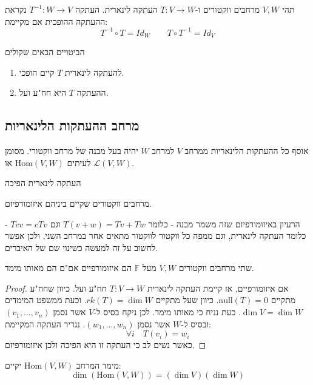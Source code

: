 \documentclass{tstextbook}
\begin{document}
\begin{definition}
תהי \(V, W\)  מרחבים ווקטורים ו-\(T:V\to W\) העתקה לינארית. העתקה \(T^{-1}:W\to V\) נקראת ההעתקה ההופכית אם מקיימת:
$$T^{-1}\circ  T=Id_{W}\qquad T\circ T^{-1}=Id_{V}$$

\end{definition}
\begin{proposition}
הביטויים הבאים שקולים

  \begin{enumerate}
    \item להעתקה לינארית \(T\) קיים הופכי. 


    \item ההעתקה \(T\) היא חח"ע ועל. 


  \end{enumerate}
\end{proposition}
\subsection{מרחב ההעתקות הלינאריות}

\begin{proposition}
אוסף כל ההעתקות הלינאריות ממרחב \(V\) למרחב \(W\) יהיה בעל מבנה של מרחב ווקטורי. מסומן לעיתים \(\mathrm{Hom}(V,W)\) או \(\mathcal{L}(V,W)\).

\end{proposition}
\begin{definition}[איזומורפיזם]
העתקה לינארית הפיכה

\end{definition}
\begin{definition}
מרחבים ווקטורים שקיים ביניהם איזומורפיזם.

\end{definition}
\begin{remark}
הרעיון באיזומורפיזם שזה משמר מבנה - כלומר \(T(v+w)=Tv+Tw\) וגם \(Tcv=cTv\) - כלומר העתקה לינארית, וגם ממפה כל ווקטור לווקטור מתאים אחר במרחב השני, ולכן אפשר לחשוב על זה למעשה כשינוי שם של האיברים.

\end{remark}
\begin{proposition}
שתי מרחבים ווקטורים \(V,W\) מעל \(\mathbb{F}\) הם איזומורפיים אם"ם הם מאותו מימד.

\end{proposition}
\begin{proof}
אם איזומורפיים, אז קיימת העתקה לינארית \(T:V\to W\) חח"ע ועל. כיוון שחח"ע מתקיים \(\text{null}(T)=0\). כיוון שעל מתקיים \(rk(T)=\dim W\). וכעת ממשפט המימדים \(\dim V=\dim W\).
כעת נניח כי מאותו מימד. לכן ניקח בסיס ל-\(V\) אשר נסמן \(\left( v_{1},\dots,v_{n} \right)\) ובסיס ל-\(W\) אשר נסמן \(\left( w_{1},\dots,w_{n} \right)\). נגדיר העתקה המקיימת:
$$\forall i\quad T(v_{i})=w_{i}$$
כאשר נשים לב כי העתקה זו היא הפיכה ולכן איזומורפיזם.

\end{proof}
\begin{proposition}
מימד המרחב \(\mathrm{Hom}(V,W)\) יקיים:
$$\dim \left( \mathrm{Hom}(V,W) \right)=\left( \dim V \right)\left( \dim  W \right)$$

\end{proposition}
\end{document}
